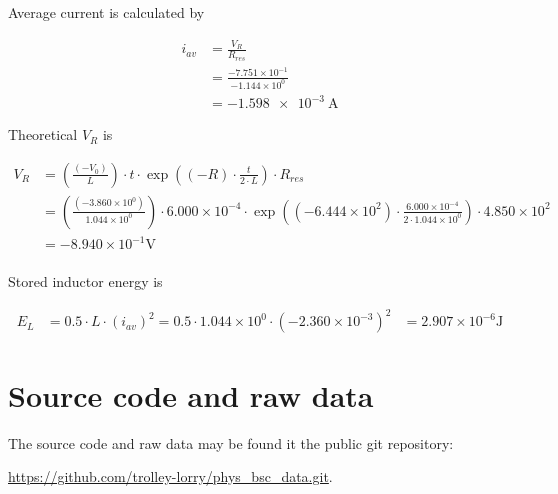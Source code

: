 Average current is calculated by

$$
\begin{aligned}
i_{av} &= \frac{ V_{R} }{ R_{res} } \\
&= \frac{-7.751 \times 10 ^ {-1}}{-1.144 \times 10 ^ {0}} \\
&= \qty{-1.598e-3}{\ampere}
\end{aligned}
$$

Theoretical $V_R$ is

$$
\begin{aligned}
V_{R} &= \left( \frac{ \left( - V_{0} \right) }{ L } \right) \cdot t \cdot \exp \left( \left( - R \right) \cdot \frac{ t }{ 2 \cdot L } \right) \cdot R_{res} \\&= \left( \frac{ \left( - 3.860 \times 10 ^ {0} \right) }{ 1.044 \times 10 ^ {0} } \right) \cdot 6.000 \times 10 ^ {-4} \cdot \exp \left( \left( - 6.444 \times 10 ^ {2} \right) \cdot \frac{ 6.000 \times 10 ^ {-4} }{ 2 \cdot 1.044 \times 10 ^ {0} } \right) \cdot 4.850 \times 10 ^ {2} \\&= -8.940 \times 10 ^ {-1} \mathrm{V}  \\
\end{aligned}
$$

Stored inductor energy is

$$
\begin{aligned}
E_{L} &= 0.5 \cdot L \cdot \left( i_{av} \right) ^{ 2 }  = 0.5 \cdot 1.044 \times 10 ^ {0} \cdot \left( -2.360 \times 10 ^ {-3} \right) ^{ 2 } &= 2.907 \times 10 ^ {-6} \mathrm{J}
\end{aligned}
$$

\section{Source code and raw data}

The source code and raw data may be found it the public git repository:

\url{https://github.com/trolley-lorry/phys_bsc_data.git}.
